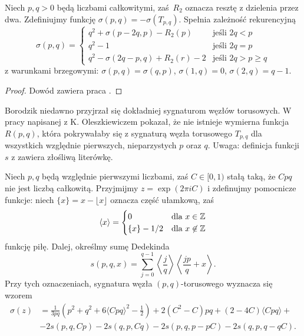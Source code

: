 \begin{proposition}
    Niech $p, q > 0$ będą liczbami całkowitymi, zaś $R_2$ oznacza resztę z dzielenia przez dwa.
    Zdefiniujmy funkcję $\sigma(p, q) = - \sigma(T_{p, q})$.
    Spełnia zależność rekurencyjną
    \begin{equation}
        \sigma(p, q) = \begin{cases}
             q^2 + \sigma(p-2q, p) - R_2(p)       & \text{jeśli } 2q < p \\
             q^2 - 1                              & \text{jeśli } 2q = p \\
             q^2 - \sigma(2q - p, q) + R_2(r) - 2 & \text{jeśli } 2q > p \ge q
        \end{cases}
    \end{equation}
    z warunkami brzegowymi: $\sigma(p, q) = \sigma(q, p)$, $\sigma(1, q) = 0$, $\sigma(2, q) = q-1$.
\end{proposition}

\begin{proof}
    Dowód zawiera praca \cite{litherland81}.
\end{proof}

Borodzik niedawno przyjrzał się dokładniej sygnaturom węzłów torusowych.
W pracy \cite{borodzik10} napisanej z K. Oleszkiewiczem pokazał, że nie istnieje wymierna funkcja $R(p, q)$, która pokrywałaby się z sygnaturą węzła torusowego $T_{p, q}$ dla wszystkich względnie pierwszych, nieparzystych $p$ oraz $q$.
Uwaga: definicja funkcji $s$ z \cite{borodzik10} zawiera złośliwą literówkę.

\begin{proposition}
    Niech $p, q$ będą względnie pierwszymi liczbami, zaś $C \in [0, 1)$ stałą taką, że $Cpq$ nie jest liczbą całkowitą.
    Przyjmijmy $z = \exp (2 \pi i C)$ i zdefinujmy pomocnicze funkcje: niech $\{x\} = x - \lfloor x \rfloor$ oznacza część ułamkową, zaś
    \begin{equation}
        \langle x \rangle = \begin{cases}
            0 & \text{dla } x \in \mathbb Z \\
            \{x\} - 1/2 & \text{dla } x \not \in \mathbb Z
        \end{cases}
    \end{equation}
    funkcję piłę.
    Dalej, określmy sumę Dedekinda
    \begin{equation}
        s(p, q, x) = \sum_{j = 0}^{q-1} \left\langle \frac {j}{q} \right\rangle \left\langle \frac {jp}{q} + x \right\rangle.
    \end{equation}
    Przy tych oznaczeniach, sygnatura węzła $(p, q)$-torusowego wyznacza się wzorem
    \begin{align}
        \sigma(z) & = \frac{1}{3pq} \left (p^2 + q^2 + 6 \langle Cpq \rangle^2 - \frac {1}{2} \right)  + 2(C^2 - C) pq + (2-4C) \langle Cpq \rangle + {} \\
        & - 2s(p, q, Cp) - 2s(q, p, Cq) - 2s(p, q, p-pC) - 2s(q, p, q-qC). \nonumber
    \end{align}
\end{proposition}

